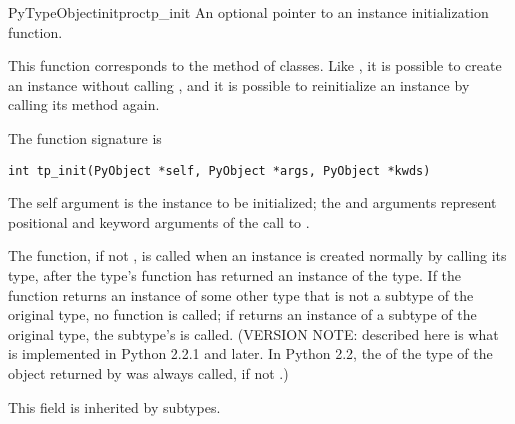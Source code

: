 \begin{cmemberdesc}{PyTypeObject}{initproc}{tp_init}
  An optional pointer to an instance initialization function.

  This function corresponds to the  method of
  classes.  Like , it is possible to create an
  instance without calling , and it is possible to
  reinitialize an instance by calling its  method
  again.

  The function signature is

\begin{verbatim}
int tp_init(PyObject *self, PyObject *args, PyObject *kwds)
\end{verbatim}

  The self argument is the instance to be initialized; the 
  and  arguments represent positional and keyword arguments
  of the call to .

  The  function, if not \NULL, is called when an
  instance is created normally by calling its type, after the type's
   function has returned an instance of the type.  If
  the  function returns an instance of some other type
  that is not a subtype of the original type, no 
  function is called; if  returns an instance of a
  subtype of the original type, the subtype's  is
  called.  (VERSION NOTE: described here is what is implemented in
  Python 2.2.1 and later.  In Python 2.2, the  of the
  type of the object returned by  was always called, if
  not \NULL.)

  This field is inherited by subtypes.
\end{cmemberdesc}

